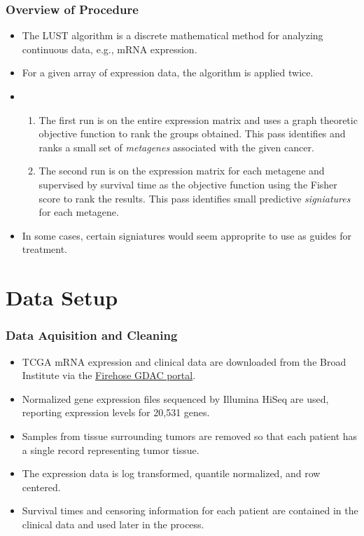 \documentclass[
	11pt, %
]{beamer}
\begin{document}
\begin{frame}
	\frametitle{Overview of Procedure}
	
	\begin{itemize}
        \item The LUST algorithm is a discrete mathematical method for analyzing continuous data, e.g., mRNA expression.
        \pause
        \item For a given array of expression data, the algorithm is applied twice.
        \pause
        \item 
        \begin{enumerate}
            \item The first run is on the entire expression matrix and uses a graph theoretic objective function to rank the groups obtained. This pass identifies and ranks a small set of \emph{metagenes} associated with the given cancer.
            \pause
            \item The second run is on the expression matrix for each metagene and supervised by survival time as the objective function using the Fisher score to rank the results. This pass identifies small predictive \emph{signiatures} for each metagene.
        \end{enumerate}
        \pause
        \item In some cases, certain signiatures would seem approprite to use as guides for treatment.
    \end{itemize}
\end{frame}


\section{Data Setup}

\begin{frame}
	\frametitle{Data Aquisition and Cleaning}
	
	\begin{itemize}
        \item TCGA mRNA expression and clinical data are downloaded from the Broad Institute via the \href{https://gdac.broadinstitute.org/}{Firehose GDAC portal}.
        \pause
        \item Normalized gene expression files sequenced by Illumina HiSeq are used, reporting expression levels for 20,531 genes.
        \pause
        \item Samples from tissue surrounding tumors are removed so that each patient has a single record representing tumor tissue.
        \pause
        \item The expression data is log transformed, quantile normalized, and row centered.
        \pause
        \item Survival times and censoring information for each patient are contained in the clinical data and used later in the process.
    \end{itemize}
\end{frame}
\end{document}
